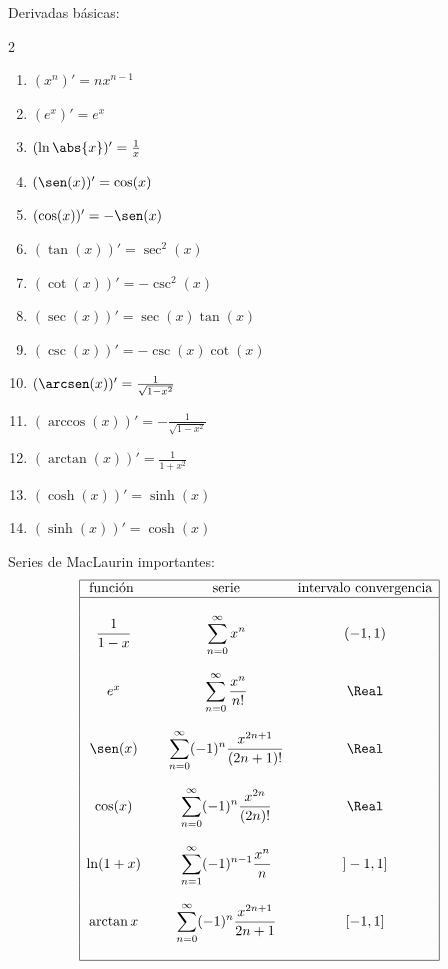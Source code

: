 \documentclass{article}
\begin{document}
{\large Derivadas básicas:}
\begin{multicols}{2}
  \begin{enumerate}
    \item $(x^n)' = nx^{n-1}$
    \item $(e^x)' = e^x$
    \item $(\ln\abs{x})' = \frac{1}{x}$
    \item $(\sen(x))' = \cos(x)$
    \item $(\cos(x))' = -\sen(x)$
    \item $(\tan(x))' = \sec^2(x)$
    \item $(\cot(x))' = -\csc^2(x)$
    \item $(\sec(x))' = \sec(x)\tan(x)$
    \item $(\csc(x))' = -\csc(x)\cot(x)$
    \item $(\arcsen(x))' = \frac{1}{\sqrt{1-x^2}}$
    \item $(\arccos(x))' = -\frac{1}{\sqrt{1-x^2}}$
    \item $(\arctan(x))' = \frac{1}{1+x^2}$
    \item $(\cosh(x))' = \sinh(x)$
    \item $(\sinh(x))' = \cosh(x)$
  \end{enumerate}
\end{multicols}
\vspace{2mm}

{\large Series de MacLaurin importantes:
$$\begin{array}{|cccc|}
  \hline
  \text{función } & & \text{serie} & \text{intervalo convergencia}\\
  \hline
  & & & \\
  \dfrac{1}{1-x} & & \displaystyle\sum_{n=0}^\infty x^n & (-1,1)\\
  & & & \\
  e^x & & \displaystyle\sum_{n=0}^\infty \frac{x^n}{n!} & \Real\\
  & & & \\
  \sen(x) & & \displaystyle\sum_{n=0}^\infty (-1)^n\frac{x^{2n+1}}{(2n+1)!} & \Real\\
  & & & \\
  \cos(x) & & \displaystyle\sum_{n=0}^\infty (-1)^n\frac{x^{2n}}{(2n)!} & \Real\\
  & & & \\
  \ln(1+x) & & \displaystyle\sum_{n=1}^\infty (-1)^{n-1}\frac{x^n}{n} & ]-1,1]\\
  & & & \\
  \arctan x & & \displaystyle\sum_{n=0}^\infty (-1)^n\frac{x^{2n+1}}{2n+1} & [-1,1]\\
  & & & \\
  \hline
\end{array}$$}
\vspace{2mm}
\end{document}
